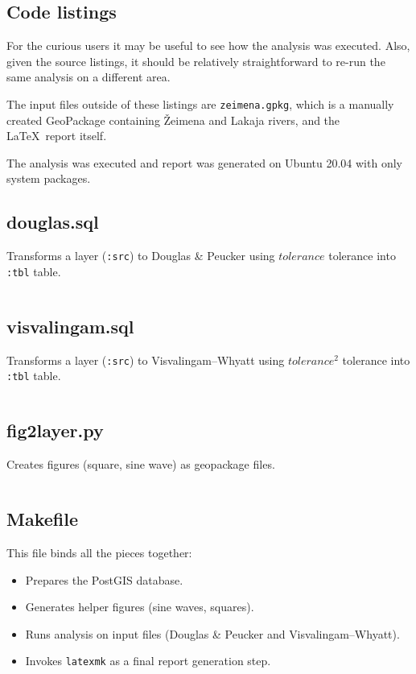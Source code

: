 \documentclass[a4paper]{article}
\newcommand{\DP}{Douglas \& Peucker}
\newcommand{\VW}{Visvalingam--Whyatt}
\begin{document}
\begin{appendices}
\section{Code listings}

For the curious users it may be useful to see how the analysis was executed.
Also, given the source listings, it should be relatively straightforward to
re-run the same analysis on a different area.

The input files outside of these listings are {\tt zeimena.gpkg}, which is a
manually created GeoPackage containing Žeimena and Lakaja rivers, and the
\LaTeX\ report itself.

The analysis was executed and report was generated on Ubuntu 20.04 with only
system packages.

\subsection{douglas.sql}
Transforms a layer ({\tt :src}) to {\DP} using $tolerance$ tolerance into
{\tt :tbl} table.
\inputminted[fontsize=\small]{sql}{douglas.sql}

\subsection{visvalingam.sql}
Transforms a layer ({\tt :src}) to {\VW} using $tolerance^2$ tolerance into
{\tt :tbl} table.
\inputminted[fontsize=\small]{sql}{visvalingam.sql}

\subsection{fig2layer.py}
Creates figures (square, sine wave) as geopackage files.
\inputminted[fontsize=\small]{python}{fig2layer.py}

\subsection{Makefile}
This file binds all the pieces together:
\begin{itemize}
    \item Prepares the PostGIS database.
    \item Generates helper figures (sine waves, squares).
    \item Runs analysis on input files ({\DP} and {\VW}).
    \item Invokes {\tt latexmk} as a final report generation step.
\end{itemize}
\inputminted[fontsize=\small]{make}{Makefile}


\end{appendices}
\end{document}

